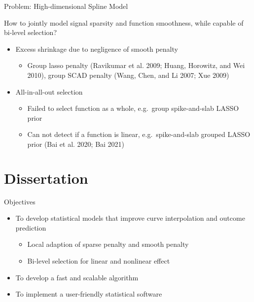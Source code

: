 \documentclass[
  ignorenonframetext,
  aspectratio=169]{beamer}
\providecommand{\tightlist}{%
  \setlength{\itemsep}{0pt}\setlength{\parskip}{0pt}}
\begin{document}
\begin{frame}{Problem: High-dimensional Spline Model}
\protect\hypertarget{problem-high-dimensional-spline-model}{}
\begin{tcolorbox}[colback=green!5,colframe=green!40!black,title=Question]
How to jointly model signal sparsity and function smoothness, while capable of bi-level selection?
\end{tcolorbox}

\begin{itemize}
\tightlist
\item
  Excess shrinkage due to negligence of smooth penalty

  \begin{itemize}
  \tightlist
  \item
    Group lasso penalty (Ravikumar et al. 2009; Huang, Horowitz, and Wei
    2010), group SCAD penalty (Wang, Chen, and Li 2007; Xue 2009)
  \end{itemize}
\item
  All-in-all-out selection

  \begin{itemize}
  \tightlist
  \item
    Failed to select function as a whole, e.g.~group spike-and-slab
    LASSO prior
  \item
    Can not detect if a function is linear, e.g.~spike-and-slab grouped
    LASSO prior (Bai et al. 2020; Bai 2021)
  \end{itemize}
\end{itemize}
\end{frame}

\hypertarget{dissertation}{%
\section{Dissertation}\label{dissertation}}

\begin{frame}{Objectives}
\protect\hypertarget{objectives}{}
\begin{itemize}
\tightlist
\item
  To develop statistical models that improve curve interpolation and
  outcome prediction

  \begin{itemize}
  \tightlist
  \item
    Local adaption of sparse penalty and smooth penalty
  \item
    Bi-level selection for linear and nonlinear effect
  \end{itemize}
\item
  To develop a fast and scalable algorithm
\item
  To implement a user-friendly statistical software
\end{itemize}
\end{frame}
\end{document}

